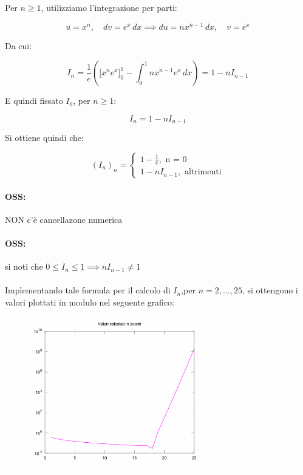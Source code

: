 \documentclass[a4paper, 11pt]{article}
\begin{document}
       Per \( n \geq 1 \), utilizziamo l'integrazione per parti:


        \[
        u = x^n, \quad dv = e^x \, dx \implies du = n x^{n-1} \, dx, \quad v = e^x 
        \]



        Da cui:


        \[
        I_n = \frac{1}{e} \left( \big[ x^n e^x \big]_0^1 - \int_{0}^{1} n x^{n-1} e^x \, dx \right) = 1-nI_{n-1}
        \]



        E quindi fissato $I_0$, per $n \geq 1$:


        \[
            I_n = 1 - n I_{n-1}
        \]

        Si ottiene quindi che:

        \[
            (I_n)_n = 
            \begin{cases}
                1-\frac{1}{e}, \text{ n = 0} \\
                1 - nI_{n-1}, \text{ altrimenti}
            \end{cases}     
        \]
        \paragraph{OSS: } NON c'è cancellazone numerica
        \paragraph{OSS: } si noti che $0 \leq I_n \leq 1 \implies nI_{n-1} \neq 1$

        
        \paragraph{}
        Implementando tale formula per il calcolo di $I_n$,per $n = 2,\ldots,25$, si ottengono i valori plottati in modulo nel seguente grafico:

        \begin{figure}
            \centering 
            \includegraphics[width=0.7\textwidth]{graph2.png} 
        \end{figure}
\end{document}
